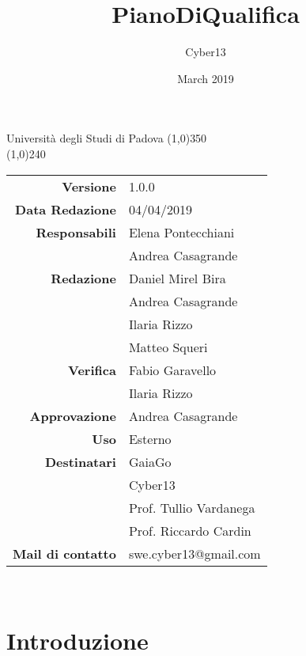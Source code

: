 \documentclass[a4paper, 12pt]{article}
\title{PianoDiQualifica}
\author{Cyber13}
\date{March 2019}
\begin{document}
	\begin{titlepage}
		\centering Università degli Studi di Padova
		\line(1,0){350}\\
		\vspace{1.2cm}
		\logo
		\vspace{1.0cm}
		\vspace{0.5cm}
		\vspace{0.5cm}
		\line(1,0){240}\\
		\begin{tabular}{r|l}
			{\textbf{Versione}} 			& 1.0.0\\
			{\textbf{Data Redazione}} 	& 04/04/2019\\	%
			{\textbf{Responsabili}} 	& Elena Pontecchiani \\ & Andrea Casagrande \\	%
			{\textbf{Redazione}} 		& Daniel Mirel Bira \\ & Andrea Casagrande \\ & Ilaria Rizzo\\ & Matteo Squeri\\
			{\textbf{Verifica}} 		 & Fabio Garavello \\ & Ilaria Rizzo\\
			{\textbf{Approvazione}} 		& Andrea Casagrande\\
			{\textbf{Uso}} 				& Esterno\\
			{\textbf{Destinatari}} & GaiaGo\\	& Cyber13\\ & Prof. Tullio Vardanega\\ & Prof. Riccardo Cardin\\
			{\textbf{Mail di contatto}} 	& swe.cyber13@gmail.com\\
		\end{tabular}\\
	\end{titlepage}

    \newpage
		
	\newpage
		\tableofcontents
    \newpage
	     \listoffigures
	\newpage
        \section{Introduzione}
        
    \newpage
\end{document}
